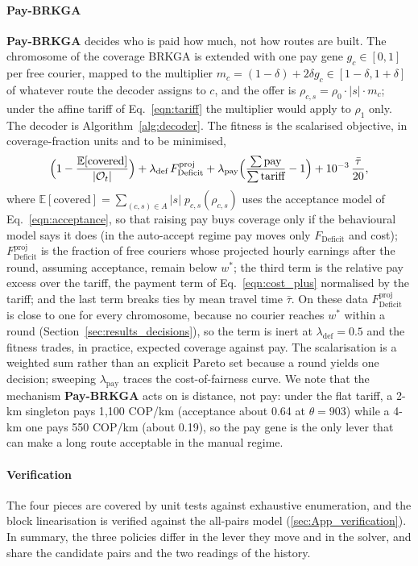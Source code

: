 \documentclass[a4paper,11pt,review,3p,authoryear]{elsarticle}
\newcommand{\FD}{F_{\text{Deficit}}}
\DeclareMathOperator{\pay}{pay}
\begin{document}
\paragraph{Pay-BRKGA}
\label{sec:paybrkga}
\textbf{Pay-BRKGA} decides who is paid how much, not how routes are built. The chromosome of the coverage BRKGA is extended with one pay gene $g_c \in [0, 1]$ per free courier, mapped to the multiplier $m_c = (1 - \delta) + 2\delta g_c \in [1-\delta, 1+\delta]$ of whatever route the decoder assigns to $c$, and the offer is $\rho_{c,s} = \rho_0 \cdot |s| \cdot m_c$; under the affine tariff of Eq.~\eqref{eqn:tariff} the multiplier would apply to $\rho_1$ only. The decoder is Algorithm~\ref{alg:decoder}. The fitness is the scalarised objective, in coverage-fraction units and to be minimised,
\begin{equation}
\Bigl(1 - \frac{\mathbb{E}[\text{covered}]}{|\mathcal{O}_t|}\Bigr)
+ \lambda_{\text{def}}\, \FD^{\text{proj}}
+ \lambda_{\text{pay}} \Bigl(\frac{\sum \pay}{\sum \text{tariff}} - 1\Bigr)
+ 10^{-3}\,\frac{\bar\tau}{20},
\label{eqn:paybrkga}
\end{equation}
where $\mathbb{E}[\text{covered}] = \sum_{(c,s) \in A} |s|\; p_{c,s}(\rho_{c,s})$ uses the acceptance model of Eq.~\eqref{eqn:acceptance}, so that raising pay buys coverage only if the behavioural model says it does (in the auto-accept regime pay moves only $\FD$ and cost); $\FD^{\text{proj}}$ is the fraction of free couriers whose projected hourly earnings after the round, assuming acceptance, remain below $w^*$; the third term is the relative pay excess over the tariff, the payment term of Eq.~\eqref{eqn:cost_plus} normalised by the tariff; and the last term breaks ties by mean travel time $\bar\tau$. On these data $\FD^{\text{proj}}$ is close to one for every chromosome, because no courier reaches $w^*$ within a round (Section~\ref{sec:results_decisions}), so the term is inert at $\lambda_{\text{def}} = 0.5$ and the fitness trades, in practice, expected coverage against pay. The scalarisation is a weighted sum rather than an explicit Pareto set because a round yields one decision; sweeping $\lambda_{\text{pay}}$ traces the cost-of-fairness curve. We note that the mechanism \textbf{Pay-BRKGA} acts on is distance, not pay: under the flat tariff, a 2-km singleton pays 1{,}100 COP/km (acceptance about 0.64 at $\theta = 903$) while a 4-km one pays 550 COP/km (about 0.19), so the pay gene is the only lever that can make a long route acceptable in the manual regime.

\paragraph{Verification} The four pieces are covered by unit tests against exhaustive enumeration, and the block linearisation is verified against the all-pairs model (\ref{sec:App_verification}). In summary, the three policies differ in the lever they move and in the solver, and share the candidate pairs and the two readings of the history.
\end{document}
